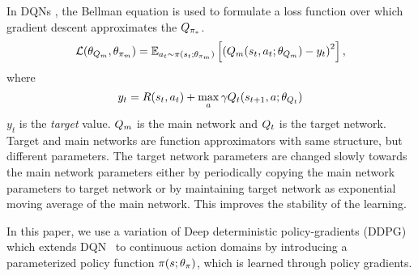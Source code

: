 In DQNs \cite{mnih2013playing}, the Bellman equation is used to
formulate a loss function over which gradient descent approximates the
$Q_{\pi_*}$.
%
%
\begin{align}
  \mathcal{L}(\theta_{Q_m}, \theta_{\pi_m}) =
    \mathbb{E}_{a_t\sim\pi(s_t; \theta_{\pi_m})}\left[\left(
  Q_m(s_t, a_t; \theta_{Q_m}) -
  y_t  \right)^2\right],
  \label{eq:bellman-dqn}
\end{align}
where 
\begin{equation}
    y_t = R(s_t, a_t) + \max_{a}\gamma Q_t(s_{t+1}, a;
    \theta_{Q_t})
\end{equation}
%
$y_t$ is the \emph{target} value.
$Q_m$ is the main network and $Q_t$ is the target network. Target and main
networks are function approximators with same structure, but different
parameters. The target network parameters are changed slowly towards the main
network parameters either by periodically copying the main network parameters to
target network or by maintaining target network as exponential moving average of
the main network. This improves the stability of the learning.


In this paper, we use a variation of
Deep deterministic policy-gradients (DDPG)~\citep{lillicrap2015continuous} which
extends DQN~\citep{MnKaSiNATURE2015} to continuous action domains by introducing
a parameterized policy function $\pi(s; \theta_\pi)$, which is
learned through policy gradients.



